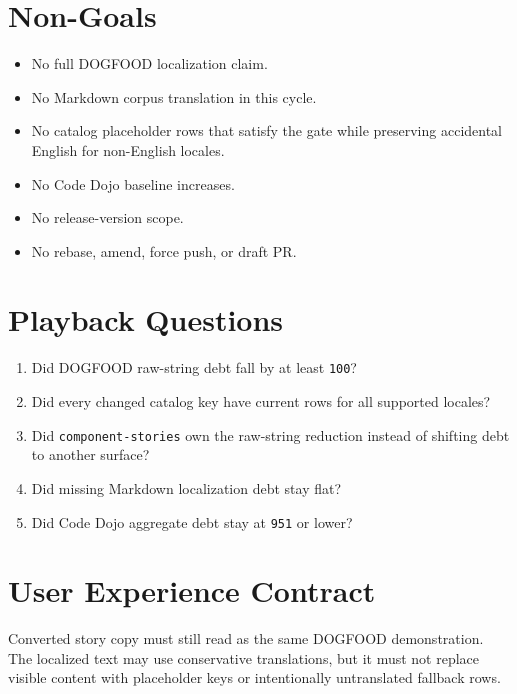 \section{Non-Goals}\label{record-197-non-goals}

\begin{itemize}
\tightlist
\item
  No full DOGFOOD localization claim.
\item
  No Markdown corpus translation in this cycle.
\item
  No catalog placeholder rows that satisfy the gate while preserving accidental English for non-English locales.
\item
  No Code Dojo baseline increases.
\item
  No release-version scope.
\item
  No rebase, amend, force push, or draft PR.
\end{itemize}

\section{Playback Questions}\label{record-197-playback-questions}

\begin{enumerate}
\def\labelenumi{\arabic{enumi}.}
\tightlist
\item
  Did DOGFOOD raw-string debt fall by at least \texttt{1\allowbreak{}0\allowbreak{}0}?
\item
  Did every changed catalog key have current rows for all supported locales?
\item
  Did \texttt{c\allowbreak{}o\allowbreak{}m\allowbreak{}p\allowbreak{}o\allowbreak{}n\allowbreak{}e\allowbreak{}n\allowbreak{}t\allowbreak{}-\allowbreak{}s\allowbreak{}t\allowbreak{}o\allowbreak{}r\allowbreak{}i\allowbreak{}e\allowbreak{}s} own the raw-string reduction instead of shifting debt to another surface?
\item
  Did missing Markdown localization debt stay flat?
\item
  Did Code Dojo aggregate debt stay at \texttt{9\allowbreak{}5\allowbreak{}1} or lower?
\end{enumerate}

\section{User Experience Contract}\label{record-197-user-experience-contract}

Converted story copy must still read as the same DOGFOOD demonstration. The localized text may use conservative translations, but it must not replace visible content with placeholder keys or intentionally untranslated fallback rows.

